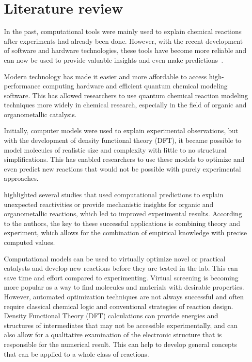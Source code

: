 \chapter{Literature review}%
\label{ch:lit-review}

In the past,
computational tools were mainly used to explain chemical reactions after experiments had already been done.
However,
with the recent development of software and hardware technologies,
these tools have become more reliable and can now be used to provide valuable insights and even make predictions~\cite{Ahn_2019}.

Modern technology has made it easier and more affordable to access high-performance computing hardware and efficient quantum chemical modeling software.
This has allowed researchers to use quantum chemical reaction modeling techniques more widely in chemical research,
especially in the field of organic and organometallic catalysis.

Initially,
computer models were used to explain experimental observations,
but with the development of density functional theory (DFT),
it became possible to model molecules of realistic size and complexity with little to no structural simplifications.
This has enabled researchers to use these models to optimize and even predict new reactions that would not be possible with purely experimental approaches.

\citeauthor{Ahn_2019} highlighted several studies that used computational predictions to explain unexpected reactivities or provide mechanistic insights for organic and organometallic reactions,
which led to improved experimental results.
According to the authors,
the key to these successful applications is combining theory and experiment,
which allows for the combination of empirical knowledge with precise computed values\cite{Ahn_2019}.

Computational models can be used to virtually optimize novel or practical catalysts and develop new reactions before they are tested in the lab.
This can save time and effort compared to experimenting.
Virtual screening is becoming more popular as a way to find molecules and materials with desirable properties.
However,
automated optimization techniques are not always successful and often require classical chemical logic and conventional strategies of reaction design.
Density Functional Theory (DFT) calculations can provide energies and structures of intermediates that may not be accessible experimentally,
and can also allow for a qualitative examination of the electronic structure that is responsible for the numerical result.
This can help to develop general concepts that can be applied to a whole class of reactions.


